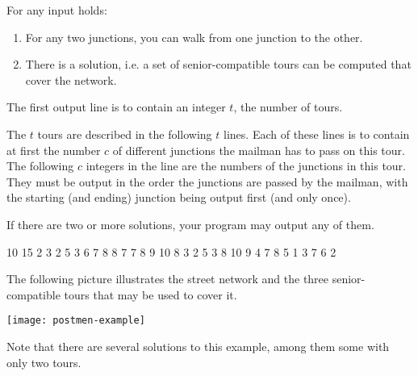 \documentclass{boi2014}
\begin{document}
    For any input holds:
    \begin{enumerate}
        \item For any two junctions, you can walk from one junction to the other.
        \item There is a solution, i.e. a set of senior-compatible tours can be
        computed that cover the network.
    \end{enumerate}

    \Output
    The first output line is to contain an integer $t$, the number of tours.

    The $t$ tours are described in the following $t$ lines. Each of these lines
    is to contain at first the number $c$ of different junctions the mailman has
    to pass on this tour. The following $c$ integers in the line are the numbers
    of the junctions in this tour. They must be output in the order the
    junctions are passed by the mailman, with the starting (and ending) junction
    being output first (and only once).

    If there are two or more solutions, your program may output any of them.

    \Example

    \renewcommand{\arraystretch}{1.5}
    {
        10 15  2  3  2  5  3  6  7  8  8  7  7  8  9  10  8
    }
    {
        3  2 5 3 8 10 9 4  7 8 5  1 3 7 6 2
    }
    {
        The following picture illustrates the street network and the three
        senior-compatible tours that may be used to cover it.

        \texttt{[image: postmen-example]}

        Note that there are several solutions to this example, among them some
        with only two tours.
    
    }
\end{document}
